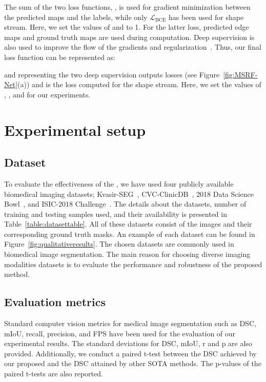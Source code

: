 \documentclass[journal,twoside,web]{IEEEtran}
\newcommand{\loss}{\ensuremath{\mathcal{L}}}
\newcommand{\lbce}{\ensuremath{\loss_\text{BCE}}\xspace}
\newcommand{\sysname}{\text{MSRF-Net}\xspace}
\begin{document}
The sum of the two loss functions, , is used for gradient minimization between the predicted maps and the labels, while only \lbce has been used for shape stream. Here, we set the values of  and  to 1. For the latter loss, predicted edge maps and ground truth maps are used during computation. Deep supervision is also used to improve the flow of the gradients and regularization~\cite{lee2015deeply}. Thus, our final loss function can be represented as:

  and   representing the two deep supervision outputs losses (see Figure~\ref{fig:MSRF-Net}(a)) and  is the loss computed for the shape stream. Here, we set the values of , ,  and  for our experiments.

\section{Experimental setup}
\subsection{Dataset}
To evaluate the effectiveness of the \sysname, we have used four publicly available biomedical imaging datasets; Kvasir-SEG~\cite{jha2020kvasir}, CVC-ClinicDB~\cite{bernal2015wm}, 2018 Data Science Bowl~\cite{caicedo2019nucleus}, and ISIC-2018 Challenge~\cite{codella2018skin,tschandl2018ham10000}. The details about the datasets, number of training and testing samples used, and their availability is presented in Table~\ref{table:datasettable}. All of these datasets consist of the images and their corresponding ground truth masks. An example of each dataset can be found in Figure~\ref{fig:qualitativeresults}. The chosen datasets are commonly used in biomedical image segmentation. The main reason for choosing diverse imaging modalities datasets is to evaluate the performance and robustness of the proposed method.  




\subsection{Evaluation metrics}
Standard computer vision metrics for medical image segmentation such as \acf{DSC}, \ac{mIoU}, recall, precision, and \ac{FPS} have been used for the evaluation of our experimental results. The standard deviations for \ac{DSC}, \ac{mIoU}, r and p are also provided. Additionally, we conduct a paired t-test between the \ac{DSC} achieved by our proposed \sysname and the \ac{DSC} attained by other \ac{SOTA} methods. The p-values of the paired t-tests are also reported.
\end{document}
